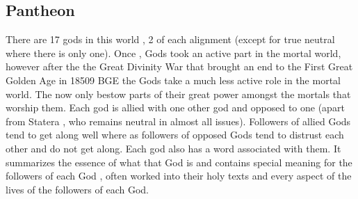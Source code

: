 \begin{onecolumn}
\chapter{Pantheon}
There are 17 gods in this world , 2 of each alignment (except for true neutral where there is only one). Once , Gods took an active part in the mortal world, however after the the Great Divinity War that brought an end to the First Great Golden Age in 18509 BGE the Gods take a much less active role in the mortal world. The now only bestow parts of their great power amongst the mortals that worship them. \newline
Each god is allied with one other god and opposed to one (apart from Statera , who remains neutral in almost all issues). Followers of allied Gods tend to get along well where as followers of opposed Gods tend to distrust each other and do not get along. \newline
Each god also has a word associated with them. It summarizes the essence of what that God is and contains special meaning for the followers of each God , often worked into their holy texts and every aspect of the lives of the followers of each God.
\clearpage

\end{onecolumn}
